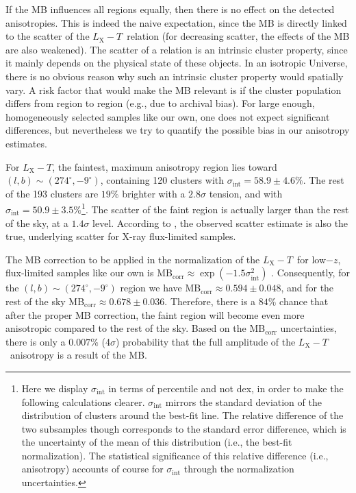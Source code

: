 \documentclass{aa}   %
\newcommand{\LT}{$L_{\text{X}}-T$}
\begin{document}
If the MB influences all regions equally, then there is no effect on the detected anisotropies. This is indeed the naive expectation, since the MB is directly linked to the scatter of the \LT\ relation (for decreasing scatter, the effects of the MB are also weakened). The scatter of a relation is an intrinsic cluster property, since it mainly depends on the physical state of these objects. In an isotropic Universe, there is no obvious reason why such an intrinsic cluster property would spatially vary. A risk factor that would make the MB relevant is if the cluster population differs from region to region (e.g., due to archival bias). For large enough, homogeneously selected samples like our own, one does not expect significant differences, but nevertheless we try to quantify the possible bias in our anisotropy estimates. 

For \LT, the faintest, maximum anisotropy region lies toward $(l,b)\sim (274^{\circ}, -9^{\circ})$, containing 120 clusters with $\sigma_{\text{int}}=58.9\pm 4.6\%$. The rest of the 193 clusters are $19\%$ brighter with a $2.8\sigma$ tension, and with $\sigma_{\text{int}}=50.9\pm 3.5\%$\footnote{Here we display $\sigma_{\text{int}}$ in terms of percentile and not dex, in order to make the following calculations clearer. $\sigma_{\text{int}}$ mirrors the standard deviation of the distribution of clusters around the best-fit line. The relative difference of the two subsamples though corresponds to the standard error difference, which is the uncertainty of the mean of this distribution (i.e., the best-fit normalization). The statistical significance of this relative difference (i.e., anisotropy) accounts of course for $\sigma_{\text{int}}$ through the normalization uncertainties.}. The scatter of the faint region is actually larger than the rest of the sky, at a $1.4\sigma$ level. According to \citet{vikh09}, the observed scatter estimate is also the true, underlying scatter for X-ray flux-limited samples. %

The MB correction to be applied in the normalization of the \LT\ for low$-z$, flux-limited samples like our own is MB$_{\text{corr}}$$\approx \exp(-1.5\sigma_{\text{int}}^2)$ \citep{vikh09}. Consequently, for the $(l,b)\sim (274^{\circ}, -9^{\circ})$ region we have MB$_{\text{corr}}$$\approx 0.594\pm 0.048$, and for the rest of the sky MB$_{\text{corr}}$$\approx 0.678\pm 0.036$. Therefore, there is a $84\%$ chance that after the proper MB correction, the faint region will become even more anisotropic compared to the rest of the sky. Based on the MB$_{\text{corr}}$ uncertainties, there is only a $0.007\%$ (4$\sigma$) probability that the full amplitude of the \LT\ anisotropy is a result of the MB.  
\end{document}

